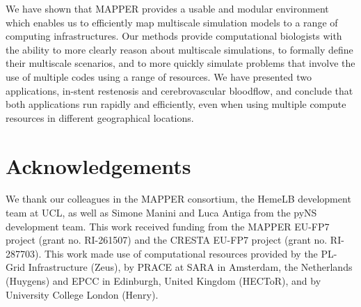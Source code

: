 \documentclass[a4,10pt]{article}
\begin{document}
We have shown that MAPPER provides a usable and modular environment which enables 
us to efficiently map multiscale simulation models to a range of computing
infrastructures. Our methods provide computational biologists with the ability to
more clearly reason about multiscale simulations, to formally define their 
multiscale scenarios, and to more quickly simulate problems that involve the use 
of multiple codes using a range of resources. We have presented two applications,
in-stent restenosis and cerebrovascular bloodflow, and conclude that both 
applications run rapidly and efficiently, even when using multiple compute resources
in different geographical locations.

\section*{Acknowledgements}

We thank our colleagues in the MAPPER consortium, the HemeLB development team
at UCL, as well as Simone Manini and Luca Antiga from the pyNS development team.  This
work received funding from the MAPPER EU-FP7 project (grant no. RI-261507) and
the CRESTA EU-FP7 project (grant no. RI-287703).  This work made use of
computational resources provided by the PL-Grid Infrastructure (Zeus), by PRACE at 
SARA in Amsterdam, the Netherlands (Huygens) and EPCC in Edinburgh, United Kingdom
(HECToR), and by University College London (Henry).



\end{document}
